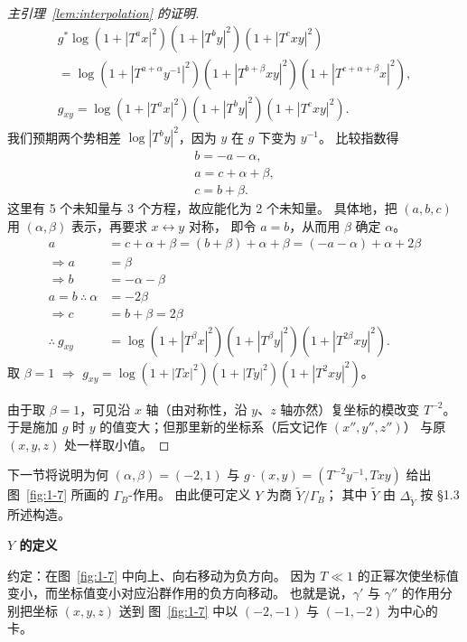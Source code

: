 \begin{proof}[{主引理~\ref{lem:interpolation} 的证明}]
\begin{gather*}
g^*\log(1+|T^ax|^2)(1+|T^by|^2)(1+|T^cxy|^2)\\
=\log(1+|T^{a+\alpha}y^{-1}|^2)(1+|T^{b+\beta}xy|^2)(1+|T^{c+\alpha+\beta}x|^2),\\
g_{xy}=\log(1+|T^ax|^2)(1+|T^by|^2)(1+|T^cxy|^2).
\end{gather*}
我们预期两个势相差 $\log|T^by|^2$，因为 $y$ 在 $g$ 下变为 $y^{-1}$。
比较指数得
\begin{gather*}
b=-a-\alpha,\\
a=c+\alpha+\beta,\\
c=b+\beta.
\end{gather*}
这里有 5 个未知量与 3 个方程，故应能化为 2 个未知量。
具体地，把 $(a,b,c)$ 用 $(\alpha,\beta)$ 表示，再要求 $x\leftrightarrow y$ 对称，
即令 $a=b$，从而用 $\beta$ 确定 $\alpha$。
\begin{align*}
a&=c+\alpha+\beta=(b+\beta)+\alpha+\beta=(-a-\alpha)+\alpha+2\beta\\
\Longrightarrow a&=\beta\\
\Longrightarrow b&=-\alpha-\beta\\
a=b\ \therefore\ \alpha&=-2\beta\\
\Longrightarrow c&=b+\beta=2\beta\\
\therefore\ g_{xy}&=\log(1+|T^\beta x|^2)(1+|T^\beta y|^2)(1+|T^{2\beta}xy|^2).
\end{align*}
取 $\beta=1$ $\Longrightarrow$ $g_{xy}=\log(1+|Tx|^2)(1+|Ty|^2)(1+|T^2xy|^2)$。

由于取 $\beta=1$，可见沿 $x$ 轴（由对称性，沿 $y$、$z$ 轴亦然）复坐标的模改变 $T^{-2}$。
于是施加 $g$ 时 $y$ 的值变大；但那里新的坐标系（后文记作 $(x'',y'',z'')$）
与原 $(x,y,z)$ 处一样取小值。
\end{proof}


下一节将说明为何 $(\alpha,\beta)=(-2,1)$ 与 $g\cdot(x,y)=(T^{-2}y^{-1},Txy)$
给出图~\ref{fig:1-7} 所画的 $\Gamma_B$-作用。
由此便可定义 $Y$ 为商 $\tilde Y/\Gamma_B$；
其中 $\tilde Y$ 由 $\Delta_{\tilde Y}$ 按 §1.3 所述构造。

\medskip\noindent\textbf{$Y$ 的定义}\par

\begin{remark}[约定]\label{rem:convention}
约定：在图~\ref{fig:1-7} 中向上、向右移动为负方向。
因为 $T\ll1$ 的正幂次使坐标值变小，而坐标值变小对应沿群作用的负方向移动。
也就是说，$\gamma'$ 与 $\gamma''$ 的作用分别把坐标 $(x,y,z)$ 送到
图~\ref{fig:1-7} 中以 $(-2,-1)$ 与 $(-1,-2)$ 为中心的卡。
\end{remark}

